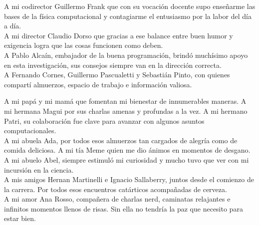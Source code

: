 A mi codirector Guillermo Frank que con su vocación docente supo enseñarme las bases de la física computacional y contagiarme el entusiasmo por la labor del día a día. \\

A mi director Claudio Dorso que gracias a ese balance entre buen humor y exigencia logra que las cosas funcionen como deben. \\

A Pablo Alcaín, embajador de la buena programación, brindó muchísimo apoyo en esta investigación, sus consejos siempre van en la dirección correcta. \\

A Fernando Cornes, Guillermo Pascualetti y Sebastián Pinto, con quienes compartí almuerzos, espacio de trabajo e información valiosa. 

A mi papá y mi mamá que fomentan mi bienestar de innumerables maneras. A mi hermana Magui por sus charlas amenas y profundas a la vez. A mi hermano Patri, su colaboración fue clave para avanzar con algunos asuntos computacionales.\\

A mi abuela Ada, por todos esos almuerzos tan cargados de alegría como de comida deliciosa. A mi tía Meme quien me dio ánimos en momentos de desgano.\\

A mi abuelo Abel, siempre estimuló mi curiosidad y mucho tuvo que ver con mi incursión en la ciencia. \\

A mis amigos Hernan Martinelli e Ignacio Sallaberry, juntos desde el comienzo de la carrera. Por todos esos encuentros catárticos acompañadas de cerveza.\\ 

A mi amor Ana Rosso, compañera de charlas nerd, caminatas relajantes e infinitos momentos llenos de risas. Sin ella no tendría la paz que necesito para estar bien. 